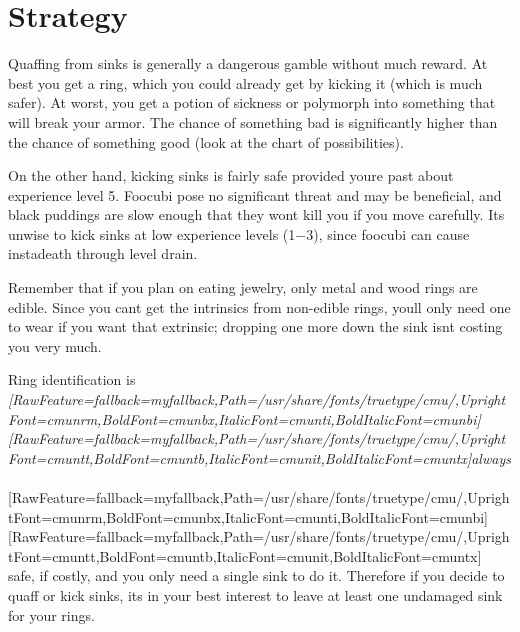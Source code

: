 \section{Strategy}
\label{5}
Quaffing from sinks is generally a dangerous gamble without much reward. At best you get a ring, which you could already get by kicking it (which is much safer). At worst, you get a potion of sickness or polymorph into something that will break your armor. The chance of something bad is significantly higher than the chance of something good (look at the chart of possibilities).


On the other hand, kicking sinks is fairly safe provided you\textquotesingle{}re past about experience level 5. Foocubi\footnotemark[113] pose no significant threat and may be beneficial, and black puddings are slow enough that they won\textquotesingle{}t kill you if you move carefully. It\textquotesingle{}s unwise to kick sinks at low experience levels (1{\mbox{$-$}}3), since foocubi can cause instadeath through level drain.


Remember that if you plan on eating jewelry\footnotemark[114], only metal and wood rings are edible. Since you can\textquotesingle{}t get the intrinsics from non-{}edible rings, you\textquotesingle{}ll only need one to wear if you want that extrinsic; dropping one more down the sink isn\textquotesingle{}t costing you very much.


Ring identification is {\itshape \allowbreak{}\setmainfont{cmunti.ttf}[RawFeature={fallback=myfallback},Path=/usr/share/fonts/truetype/cmu/,UprightFont=cmunrm,BoldFont=cmunbx,ItalicFont=cmunti,BoldItalicFont=cmunbi]\setmonofont{cmunti.ttf}[RawFeature={fallback=myfallback},Path=/usr/share/fonts/truetype/cmu/,UprightFont=cmuntt,BoldFont=cmuntb,ItalicFont=cmunit,BoldItalicFont=cmuntx]\itshape always}{$\text{ }$}\allowbreak{}\setmainfont{cmunrm.ttf}[RawFeature={fallback=myfallback},Path=/usr/share/fonts/truetype/cmu/,UprightFont=cmunrm,BoldFont=cmunbx,ItalicFont=cmunti,BoldItalicFont=cmunbi]\setmonofont{cmunrm.ttf}[RawFeature={fallback=myfallback},Path=/usr/share/fonts/truetype/cmu/,UprightFont=cmuntt,BoldFont=cmuntb,ItalicFont=cmunit,BoldItalicFont=cmuntx] safe, if costly, and you only need a single sink to do it. Therefore if you decide to quaff or kick sinks, it\textquotesingle{}s in your best interest to leave at least one undamaged sink for your rings.




